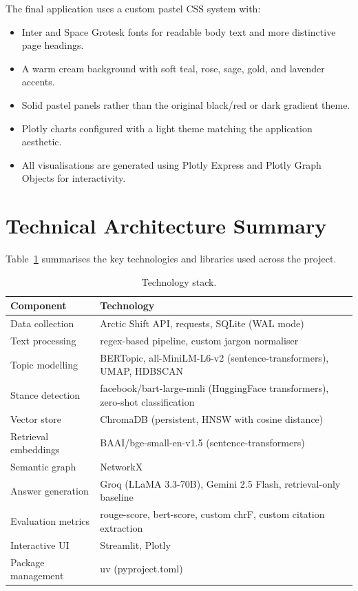 \documentclass[11pt,a4paper]{article}
\begin{document}
The final application uses a custom pastel CSS system with:
\begin{itemize}[leftmargin=*]
  \item Inter and Space Grotesk fonts for readable body text and more distinctive page headings.
  \item A warm cream background with soft teal, rose, sage, gold, and lavender accents.
  \item Solid pastel panels rather than the original black/red or dark gradient theme.
  \item Plotly charts configured with a light theme matching the application aesthetic.
  \item All visualisations are generated using Plotly Express and Plotly Graph Objects for interactivity.
\end{itemize}


\section{Technical Architecture Summary}
\label{sec:architecture}

Table~\ref{tab:tech-stack} summarises the key technologies and libraries used across the project.

\begin{table}[H]
\centering
\caption{Technology stack.}
\label{tab:tech-stack}
\begin{tabularx}{\textwidth}{lX}
\toprule
Component & Technology \\
\midrule
Data collection & Arctic Shift API, requests, SQLite (WAL mode) \\
Text processing & regex-based pipeline, custom jargon normaliser \\
Topic modelling & BERTopic, all-MiniLM-L6-v2 (sentence-transformers), UMAP, HDBSCAN \\
Stance detection & facebook/bart-large-mnli (HuggingFace transformers), zero-shot classification \\
Vector store & ChromaDB (persistent, HNSW with cosine distance) \\
Retrieval embeddings & BAAI/bge-small-en-v1.5 (sentence-transformers) \\
Semantic graph & NetworkX \\
Answer generation & Groq (LLaMA 3.3-70B), Gemini 2.5 Flash, retrieval-only baseline \\
Evaluation metrics & rouge-score, bert-score, custom chrF, custom citation extraction \\
Interactive UI & Streamlit, Plotly \\
Package management & uv (pyproject.toml) \\
\bottomrule
\end{tabularx}
\end{table}
\end{document}
